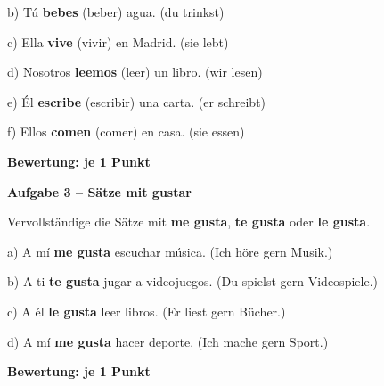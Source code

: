 \documentclass[11pt, a4paper]{article}
\newcommand{\fachfarbe}{spanisch}
\newcommand{\punktebox}[1]{\hfill\fbox{\small \_/#1}}
\newcommand{\lsg}[1]{\textcolor{loesung}{\textbf{#1}}}
\newenvironment{aufgabe}[1]{%
    \needspace{5\baselineskip}%
    \nopagebreak[4]%
    \vspace{10pt}
    \noindent\textbf{\textcolor{\fachfarbe}{Aufgabe #1}}
    \nopagebreak[4]%
    \vspace{5pt}
    \nopagebreak[4]%
    \begin{list}{}{\leftmargin=0pt}
    \item[]
}{%
    \end{list}
}
\newcommand{\es}[1]{\textcolor{\fachfarbe}{\textbf{#1}}}
\begin{document}
\noindent
b) Tú \lsg{bebes} (beber) agua. \hfill (du trinkst)

\vspace{0.8em}

\noindent
c) Ella \lsg{vive} (vivir) en Madrid. \hfill (sie lebt)

\vspace{0.8em}

\noindent
d) Nosotros \lsg{leemos} (leer) un libro. \hfill (wir lesen)

\vspace{0.8em}

\noindent
e) Él \lsg{escribe} (escribir) una carta. \hfill (er schreibt)

\vspace{0.8em}

\noindent
f) Ellos \lsg{comen} (comer) en casa. \hfill (sie essen)

\lsg{Bewertung: je 1 Punkt}

\vspace{15pt}


\begin{aufgabe}{3 -- Sätze mit gustar}
Vervollständige die Sätze mit \es{me gusta}, \es{te gusta} oder \es{le gusta}. \punktebox{4}
\end{aufgabe}

\noindent
a) A mí \lsg{me gusta} escuchar música. \hfill (Ich höre gern Musik.)

\vspace{0.8em}

\noindent
b) A ti \lsg{te gusta} jugar a videojuegos. \hfill (Du spielst gern Videospiele.)

\vspace{0.8em}

\noindent
c) A él \lsg{le gusta} leer libros. \hfill (Er liest gern Bücher.)

\vspace{0.8em}

\noindent
d) A mí \lsg{me gusta} hacer deporte. \hfill (Ich mache gern Sport.)

\lsg{Bewertung: je 1 Punkt}

\vspace{15pt}

\end{document}
